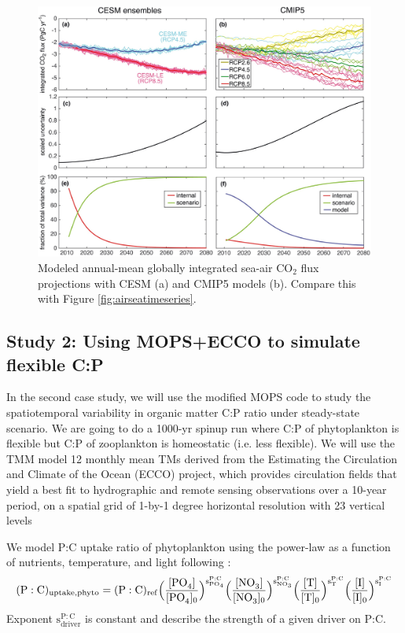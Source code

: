 \documentclass[a4paper]{article}
\begin{document}
\begin{enumerate}
\begin{figure}[h!]   %
   \centering
   \includegraphics[trim=0 760 0 0,clip,scale=0.3]{Lovenduski16_GBC_Fig2.jpg}
   \caption[]{Modeled annual-mean globally integrated sea-air $\mathrm{CO_2}$ flux projections \citep[from][]{Lovenduski16} with CESM (a) and CMIP5 models (b). Compare this with Figure \ref{fig:airseatimeseries}.}
   \label{fig:airseatimeseries_cmip5}
\end{figure}

\end{enumerate}

\subsection{Study 2: Using MOPS+ECCO to simulate flexible C:P}

In the second case study, we will use the modified MOPS code to study the spatiotemporal variability in organic matter C:P ratio under steady-state scenario. We are going to do a  1000-yr spinup run where C:P of phytoplankton is flexible but C:P of zooplankton is homeostatic (i.e. less flexible). We will use the TMM model 12 monthly mean TMs derived from the Estimating the Circulation and Climate of the Ocean (ECCO) project, which provides circulation fields that yield a best fit to hydrographic and remote sensing observations over a 10-year period, on a spatial grid of 1-by-1 degree horizontal resolution with 23 vertical levels

We model P:C uptake ratio of phytoplankton using the power-law as a function of nutrients, temperature, and light following \cite{Tanioka20}:
\begin{equation}
   \mathrm{(P:C)_{uptake,phyto}} = \mathrm{(P:C)_{ref} \Bigl (\frac{[\ce{PO4}]}{[\ce{PO4}]_0} \Bigr )^{s^{P:C}_{PO_4}} \Bigl (\frac{[\ce{NO3}]}{[\ce{NO3}]_0} \Bigr )^{s^{P:C}_{NO_3}} \Bigl (\frac{[\ce{T}]}{[\ce{T}]_0} \Bigr )^{s^{P:C}_{T}} \Bigl (\frac{[\ce{I}]}{[\ce{I}]_0} \Bigr )^{s^{P:C}_{I}}} \label{eq:eq_pcphy}
\end{equation}
Exponent $\mathrm{{s^{P:C}_{driver}}}$ is constant and describe the strength of a given driver on P:C. 
\end{document}

